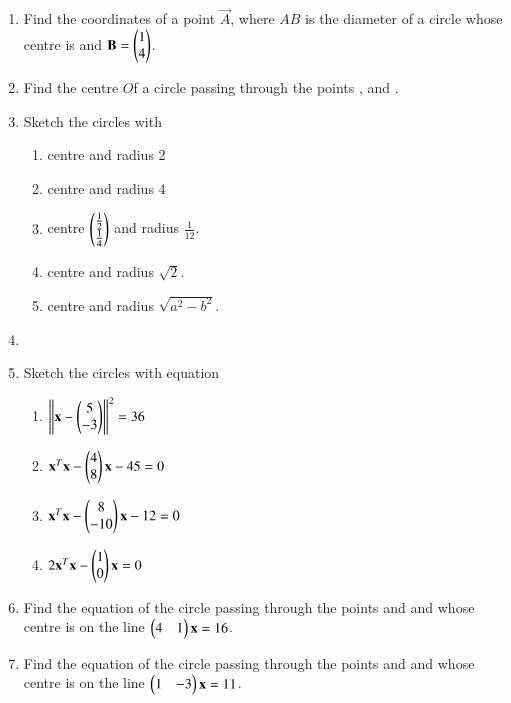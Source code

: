 \renewcommand{\theequation}{\theenumi}
\begin{enumerate}[label=\arabic*.,ref=\thesubsection.\theenumi]
\item Find the coordinates of a point $\vec{A}$, where $AB$ is the diameter of a circle whose centre is  and $\mathbf{B} = \begin{pmatrix}1\\4\end{pmatrix}$.
\item Find the centre $O$f a circle passing through the points ,  and  .
\item Sketch the circles with 
\begin{enumerate}
\item centre  and radius 2
\item centre  and radius 4
\item centre $\begin{pmatrix}\frac{1}{2}\\ \frac{1}{4}\end{pmatrix}$ and radius $\frac{1}{12}$.
\item centre  and radius $\sqrt{2}$.
\item centre  and radius $\sqrt{a^2-b^2}$.
\end{enumerate}
\item 
\item Sketch the circles with equation
\begin{enumerate}
\item $\left\lVert\mathbf{x}-\begin{pmatrix}5\\-3\end{pmatrix}\right\rVert^2 = 36$
\item $\mathbf{x}^T\mathbf{x}-\begin{pmatrix}4\\8\end{pmatrix}\mathbf{x} -45= 0$
\item $\mathbf{x}^T\mathbf{x}-\begin{pmatrix}8\\-10\end{pmatrix}\mathbf{x} -12= 0$
\item $2\mathbf{x}^T\mathbf{x}-\begin{pmatrix}1\\0\end{pmatrix}\mathbf{x} = 0$
\end{enumerate}
%
\item Find the equation of the circle passing through the points  and  and whose centre is on the line $\begin{pmatrix}4 & 1\end{pmatrix}\mathbf{x} = 16$.
\item Find the equation of the circle passing through the points  and  and whose centre is on the line $\begin{pmatrix}1 & -3\end{pmatrix}\mathbf{x} = 11$.

\end{enumerate}
